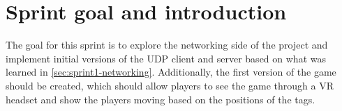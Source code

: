 \section{Sprint goal and introduction}\label{sec:sprint1-goals}
The goal for this sprint is to explore the networking side of the project and implement initial versions of the UDP client and server based on what was learned in \autoref{sec:sprint1-networking}.
Additionally, the first version of the game should be created, which should allow players to see the game through a VR headset and show the players moving based on the positions of the tags.
